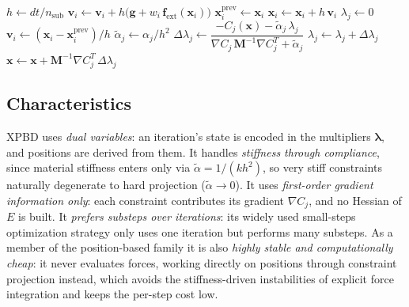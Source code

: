 \begin{algorithm}[!ht]
\caption{XPBD step (core comparison). $n_{\mathrm{sub}}$ substeps, each with
         $n_{\mathrm{it}}$ Gauss--Seidel iterations over the constraints.}
\label{alg:XPBDCore}
\begin{algorithmic}[1]
\State $h \gets dt / n_{\mathrm{sub}}$ 
        \State $\mathbf{v}_i \gets \mathbf{v}_i + h\bigl(\mathbf{g} + w_i\,\mathbf{f}_{\mathrm{ext}}(\mathbf{x}_i)\bigr)$
        \State $\mathbf{x}^{\mathrm{prev}}_i \gets \mathbf{x}_i$
        \State $\mathbf{x}_i \gets \mathbf{x}_i + h\,\mathbf{v}_i$
    \EndFor
        \State $\lambda_j \gets 0$ 
    \EndFor
        \State {}
    \EndFor
        \State $\mathbf{v}_i \gets (\mathbf{x}_i - \mathbf{x}^{\mathrm{prev}}_i)/h$
    \EndFor
\EndFor
\Statex
{}
     
        \State $\tilde{\alpha}_j \gets \alpha_j / h^2$
        \State $\Delta\lambda_j \gets \dfrac{-C_j(\mathbf{x}) - \tilde{\alpha}_j\,\lambda_j}
                {\nabla C_j\,\mathbf{M}^{-1}\nabla C_j^{T} + \tilde{\alpha}_j}$
        \State $\lambda_j \gets \lambda_j + \Delta\lambda_j$
        \State $\mathbf{x} \gets \mathbf{x} + \mathbf{M}^{-1}\nabla C_j^{T}\,\Delta\lambda_j$
    \EndFor
\EndProcedure
\end{algorithmic}
\end{algorithm}

\subsection{Characteristics}
\label{ssec:XPBDChar}
XPBD uses \emph{dual variables}: an iteration's
state is encoded in the multipliers $\boldsymbol{\lambda}$, and positions are
derived from them. It handles \emph{stiffness through compliance}, since material
stiffness enters only via $\tilde{\alpha} = 1/(k h^{2})$, so very stiff
constraints naturally degenerate to hard projection ($\tilde\alpha \to 0$). It
uses \emph{first-order gradient information only}: each constraint contributes its
gradient $\nabla C_j$, and no Hessian of $E$ is built. It \emph{prefers
substeps over iterations}: its widely used small-steps optimization strategy only
uses one iteration but performs many substeps. As a member of the position-based
family it is also \emph{highly stable and computationally cheap}: it never
evaluates forces, working directly on positions through constraint projection
instead, which avoids the stiffness-driven instabilities of explicit force
integration and keeps the per-step cost low.

